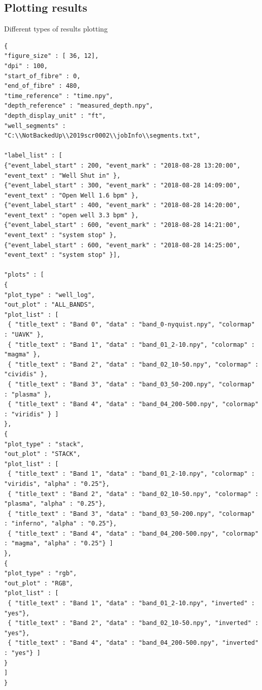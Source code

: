 \subsection{Plotting results}
Different types of results plotting
\begin{lstlisting}
{
"figure_size" : [ 36, 12],
"dpi" : 100,
"start_of_fibre" : 0,
"end_of_fibre" : 480,
"time_reference" : "time.npy",
"depth_reference" : "measured_depth.npy",
"depth_display_unit" : "ft",
"well_segments" : "C:\\NotBackedUp\\2019scr0002\\jobInfo\\segments.txt",

"label_list" : [ 
{"event_label_start" : 200, "event_mark" : "2018-08-28 13:20:00", "event_text" : "Well Shut in" },
{"event_label_start" : 300, "event_mark" : "2018-08-28 14:09:00", "event_text" : "Open Well 1.6 bpm" },
{"event_label_start" : 400, "event_mark" : "2018-08-28 14:20:00", "event_text" : "open well 3.3 bpm" },
{"event_label_start" : 600, "event_mark" : "2018-08-28 14:21:00", "event_text" : "system stop" },
{"event_label_start" : 600, "event_mark" : "2018-08-28 14:25:00", "event_text" : "system stop" }],

"plots" : [
{
"plot_type" : "well_log",
"out_plot" : "ALL_BANDS",
"plot_list" : [ 
 { "title_text" : "Band 0", "data" : "band_0-nyquist.npy", "colormap" : "UAVK" },
 { "title_text" : "Band 1", "data" : "band_01_2-10.npy", "colormap" : "magma" },
 { "title_text" : "Band 2", "data" : "band_02_10-50.npy", "colormap" : "cividis" },
 { "title_text" : "Band 3", "data" : "band_03_50-200.npy", "colormap" : "plasma" },
 { "title_text" : "Band 4", "data" : "band_04_200-500.npy", "colormap" : "viridis" } ]
},
{
"plot_type" : "stack",
"out_plot" : "STACK",
"plot_list" : [ 
 { "title_text" : "Band 1", "data" : "band_01_2-10.npy", "colormap" : "viridis", "alpha" : "0.25"},
 { "title_text" : "Band 2", "data" : "band_02_10-50.npy", "colormap" : "plasma", "alpha" : "0.25"},
 { "title_text" : "Band 3", "data" : "band_03_50-200.npy", "colormap" : "inferno", "alpha" : "0.25"},
 { "title_text" : "Band 4", "data" : "band_04_200-500.npy", "colormap" : "magma", "alpha" : "0.25"} ]
},
{
"plot_type" : "rgb",
"out_plot" : "RGB",
"plot_list" : [ 
 { "title_text" : "Band 1", "data" : "band_01_2-10.npy", "inverted" : "yes"},
 { "title_text" : "Band 2", "data" : "band_02_10-50.npy", "inverted" : "yes"},
 { "title_text" : "Band 4", "data" : "band_04_200-500.npy", "inverted" : "yes"} ]
}
] 
}
\end{lstlisting}
